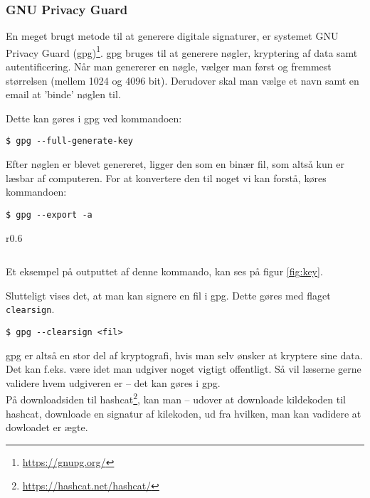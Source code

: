     \subsubsection{GNU Privacy Guard}
    En meget brugt metode til at generere digitale signaturer, er systemet GNU Privacy Guard (gpg)\footnote{\url{https://gnupg.org/}}.
    gpg bruges til at generere nøgler, kryptering af data samt autentificering.
    Når man genererer en nøgle, vælger man først og fremmest størrelsen (mellem 1024 og 4096 bit).
    Derudover skal man vælge et navn samt en email at 'binde' nøglen til.
    \par
    Dette kan gøres i gpg ved kommandoen:
    \begin{verbatim}
$ gpg --full-generate-key
    \end{verbatim}


    Efter nøglen er blevet genereret, ligger den som en binær fil, som altså kun er læsbar af computeren.
    For at konvertere den til noget vi kan forstå, køres kommandoen:


    \begin{verbatim}
$ gpg --export -a
    \end{verbatim}

    \begin{wrapfigure}{r}{0.6\textwidth}
        \vspace{-30pt}
        \begin{center}
            \inputminted[python3, breaklines, fontsize=\scriptsize]{bash}{src/public.key}
            \vspace{-20pt}
            \caption{1024-bit nøgle genereret i gpg}
            \label{fig:key}
        \end{center}
        \vspace{-50pt}
    \end{wrapfigure}

    Et eksempel på outputtet af denne kommando, kan ses på figur \ref{fig:key}.
    \par
    Slutteligt vises det, at man kan signere en fil i gpg.
    Dette gøres med flaget \texttt{clearsign}.
    \begin{verbatim}
$ gpg --clearsign <fil>
    \end{verbatim}

    gpg er altså en stor del af kryptografi, hvis man selv ønsker at kryptere sine data.
    Det kan f.eks. være idet man udgiver noget vigtigt offentligt.
    Så vil læserne gerne validere hvem udgiveren er -- det kan gøres i gpg.\\
    På downloadsiden til hashcat\footnote{\url{https://hashcat.net/hashcat/}}, kan man -- udover at downloade kildekoden til hashcat, downloade en signatur af kilekoden, ud fra hvilken, man kan vadidere at dowloadet er ægte.


